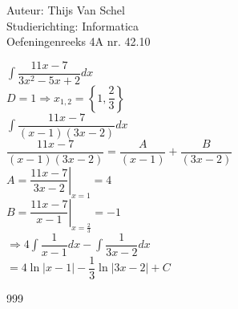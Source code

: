 \documentclass[a4paper]{article}
\newcommand{\dint}{\displaystyle\int}
\begin{document}
  
\noindent \large Auteur: Thijs Van Schel \\
\noindent \large Studierichting: Informatica\\
\noindent \large Oefeningenreeks 4A nr. 42.10\\

\medskip

\normalsize

$\dint \dfrac{11x-7}{3x^2-5x+2}dx$\\

$D = 1 \Rightarrow x_{1,2} = \left\{1,\dfrac{2}{3}\right\}$\\

$\dint \dfrac{11x-7}{(x-1)(3x-2)}dx$\\

$\dfrac{11x-7}{(x-1)(3x-2)} = \dfrac{A}{(x-1)}+\dfrac{B}{(3x-2)}$\\

$A = \left . \dfrac{11x-7}{3x-2}\right |_{x=1}=4$\\

$B = \left . \dfrac{11x-7}{x-1}\right |_{x=\tfrac{2}{3}}=-1$\\

$\Rightarrow 4\dint \dfrac{1}{x-1}dx-\dint \dfrac{1}{3x-2}dx$\\

$= 4\ln |x-1| - \dfrac{1}{3}\ln|3x-2| + C$

\begin{thebibliography}{999}
\end{thebibliography}
\end{document}
